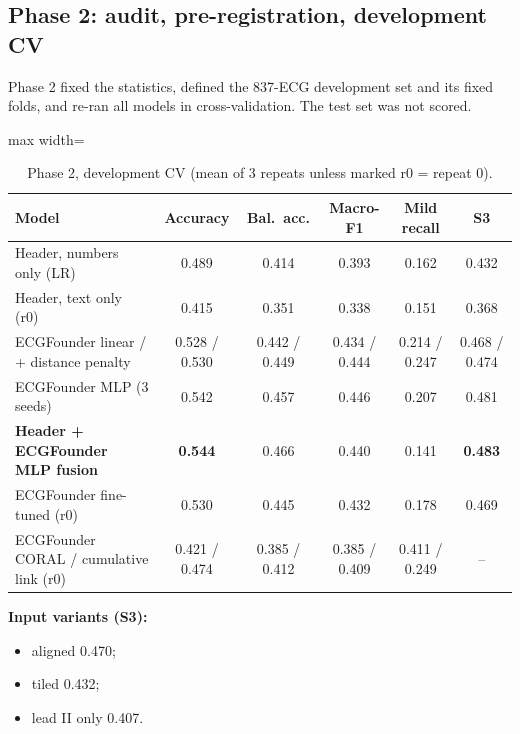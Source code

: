 \subsection{Phase 2: audit, pre-registration, development CV}
Phase 2 fixed the statistics, defined the 837-ECG development set and its fixed folds, and re-ran all models in
cross-validation. The test set was not scored.
\begin{table}[H]\centering\small
\caption{Phase 2, development CV (mean of 3 repeats unless marked r0 = repeat 0).}\label{tab:p2}
\begin{adjustbox}{max width=\linewidth}
\begin{tabular}{lccccc}\toprule
Model & Accuracy & Bal.\ acc. & Macro-F1 & Mild recall & S3 \\\midrule
Header, numbers only (LR) & 0.489 & 0.414 & 0.393 & 0.162 & 0.432 \\
Header, text only (r0) & 0.415 & 0.351 & 0.338 & 0.151 & 0.368 \\
ECGFounder linear / + distance penalty & 0.528 / 0.530 & 0.442 / 0.449 & 0.434 / 0.444 & 0.214 / 0.247 & 0.468 / 0.474 \\
ECGFounder MLP (3 seeds) & 0.542 & 0.457 & 0.446 & 0.207 & 0.481 \\
\textbf{Header + ECGFounder MLP fusion} & \textbf{0.544} & 0.466 & 0.440 & 0.141 & \textbf{0.483} \\
ECGFounder fine-tuned (r0) & 0.530 & 0.445 & 0.432 & 0.178 & 0.469 \\
ECGFounder CORAL / cumulative link (r0) & 0.421 / 0.474 & 0.385 / 0.412 & 0.385 / 0.409 & 0.411 / 0.249 & -- \\\bottomrule
\end{tabular}
\end{adjustbox}
\end{table}
\textbf{Input variants (S3):}
\begin{itemize}
  \item aligned 0.470;
  \item tiled 0.432;
  \item lead II only 0.407.
\end{itemize}

